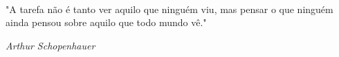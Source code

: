 \pretextualchapter{}

  \vfill\
  \begin{flushright}
    "A tarefa não é tanto ver aquilo que ninguém viu, mas pensar o que ninguém ainda pensou sobre aquilo que todo mundo vê."


\textit{Arthur Schopenhauer}
  \end{flushright}